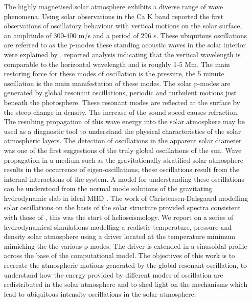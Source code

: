 \documentclass[authoryear,final,1p]{elsarticle}
\begin{document}
The highly magnetised solar atmosphere exhibits a diverse range of wave phenomena. Using solar observations in the Ca K band \citet{Leighton1960} reported the first observations of oscillatory behaviour with  vertical motions on the solar surface, an amplitude of 300-400 m/s and a period of 296 s. These ubiquitous oscillations are referred to as the p-modes these standing acoustic waves in the solar interior were explained by \citet{Ulrich1970}. \citet{Leibacher1971} reported analysis indicating that the vertical wavelength is comparable to the horizontal wavelength and is roughly 1-5 Mm. The main restoring force for these modes of oscillation is the pressure, the 5 minute oscillation is the main manifestation of these modes. The solar p-modes are generated by global resonant oscillations, periodic  and turbulent motions just beneath the photosphere.  These resonant modes are reflected at the surface by the steep change in density. The increase of the sound speed causes refraction. The resulting propagation of this wave energy into the solar atmosphere may be used as a diagnostic tool to understand the physical characteristics of the  solar atmospheric layers. The detection of oscillations in the apparent solar diameter \citep[see e.g][]{Hill1976, Brown1978} was one of the first suggestions of the truly global oscillations of the sun.  Wave propagation in a medium such as the gravitationally stratified solar atmosphere results in the occurrence of eigen-oscillations, these oscillations result from the internal interactions of the system. A model for understanding these oscillations can be understood from the normal mode solutions of the gravitating  hydrodynamic slab in ideal MHD \citet{Goedbloed2004}. The work of Christensen-Dalsgaard modelling solar oscillations on the basis of the solar structure provided spectra consistent with those of \citet{Hill1976, Brown1978}, this was the start of helioseismology.  We report on a series of hydrodynamical simulations modelling a realistic temperature, pressure and density solar atmosphere using a driver located at the temperature minimum mimicking the the various p-modes. The driver is extended in a sinusoidal profile across the base of the computational model.  The objectives of this work is to recreate the atmospheric motions generated by the global resonant oscillation, to  understand how the energy provided by different modes of oscillation are redistributed in the solar atmosphere and to shed light on the mechanisms which lead to ubiquitous intensity oscillations in the solar atmosphere.   
\end{document}

